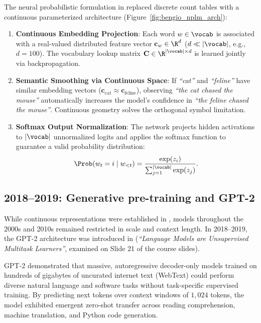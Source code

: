 \documentclass[../../main.tex]{subfiles}
\begin{document}
The neural probabilistic formulation in \cite{bengio2003} replaced discrete count tables with a continuous parameterized architecture (Figure~\ref{fig:bengio_nplm_arch}):
\begin{enumerate}
    \item \textbf{Continuous Embedding Projection}: Each word $w \in \vocab$ is associated with a real-valued distributed feature vector $\mathbf{c}_w \in \R^d$ ($d \ll |\vocab|$, e.g., $d = 100$). The vocabulary lookup matrix $\mathbf{C} \in \R^{|\vocab| \times d}$ is learned jointly via backpropagation.
    \item \textbf{Semantic Smoothing via Continuous Space}: If \textit{``cat''} and \textit{``feline''} have similar embedding vectors ($\mathbf{c}_{\text{cat}} \approx \mathbf{c}_{\text{feline}}$), observing \textit{``the cat chased the mouse''} automatically increases the model's confidence in \textit{``the feline chased the mouse''}. Continuous geometry solves the orthogonal symbol limitation.
    \item \textbf{Softmax Output Normalization}: The network projects hidden activations to $|\vocab|$ unnormalized logits and applies the softmax function to guarantee a valid probability distribution:
    \begin{equation}
    \label{eq:bengio_softmax}
    \Prob(w_t = i \mid w_{<t}) = \frac{\exp(z_i)}{\sum_{j=1}^{|\vocab|} \exp(z_j)}.
    \end{equation}
\end{enumerate}

\subsection{2018--2019: Generative pre-training and GPT-2}
\label{subsec:milestone_gpt2}

While continuous representations were established in \cite{bengio2003}, models throughout the 2000s and 2010s remained restricted in scale and context length. In 2018--2019, the GPT-2 architecture was introduced in \cite{radford2019} (\textit{``Language Models are Unsupervised Multitask Learners''}, examined on Slide 21 of the course slides).

GPT-2 demonstrated that massive, autoregressive decoder-only models trained on hundreds of gigabytes of uncurated internet text (WebText) could perform diverse natural language and software tasks without task-specific supervised training. By predicting next tokens over context windows of $1{,}024$ tokens, the model exhibited emergent zero-shot transfer across reading comprehension, machine translation, and Python code generation.
\end{document}
